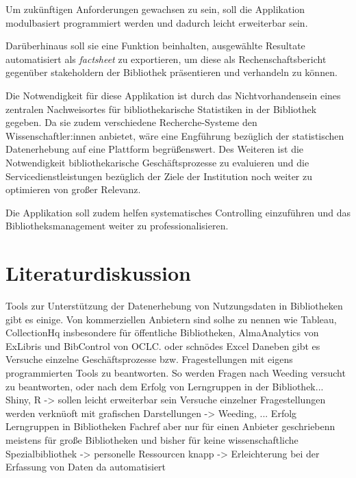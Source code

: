 \documentclass[10pt,a4paper,twocolumn,conference]{IEEEtran}
\begin{document}
Um zukünftigen Anforderungen gewachsen zu sein, soll die Applikation
modulbasiert programmiert werden und dadurch leicht erweiterbar sein.

Darüberhinaus soll sie eine Funktion beinhalten, ausgewählte
Resultate automatisiert als \textit{factsheet} zu exportieren, um diese 
als Rechenschaftsbericht gegenüber stakeholdern der Bibliothek präsentieren und
verhandeln zu können.

Die Notwendigkeit für diese Applikation ist durch das
Nichtvorhandensein eines zentralen Nachweisortes für bibliothekarische
Statistiken in der Bibliothek gegeben. Da sie zudem verschiedene Recherche-Systeme den
Wissenschaftler:innen anbietet, wäre eine Engführung bezüglich der statistischen
Datenerhebung auf eine Plattform begrüßenswert.
Des Weiteren ist die Notwendigkeit bibliothekarische Geschäftsprozesse zu evaluieren und die
Servicedienstleistungen bezüglich der Ziele der Institution noch weiter zu
optimieren von großer Relevanz.

Die Applikation soll zudem helfen systematisches Controlling einzuführen und das
Bibliotheksmanagement weiter zu professionalisieren.


\section{Literaturdiskussion}
Tools zur Unterstützung der Datenerhebung von Nutzungsdaten in Bibliotheken
gibt es einige. Von kommerziellen Anbietern sind solhe zu nennen wie Tableau,
CollectionHq insbesondere für öffentliche Bibliotheken, AlmaAnalytics von
ExLibris und BibControl von OCLC.
oder schnödes Excel
Daneben gibt es 
Versuche einzelne Geschäftsprozesse bzw. Fragestellungen mit eigens
programmierten Tools zu beantworten. So werden Fragen nach Weeding versucht zu
beantworten, oder nach dem Erfolg von Lerngruppen in der Bibliothek...
Shiny, R -> sollen leicht erweiterbar sein
Versuche einzelner Fragestellungen werden verknüoft mit grafischen
Darstellungen -> Weeding, ... Erfolg Lerngruppen in Bibliotheken
Fachref aber nur für einen Anbieter geschriebenn
meistens für große Bibliotheken und bisher für keine wissenschaftliche
Spezialbibliothek -> personelle Ressourcen knapp -> Erleichterung bei der
Erfassung von Daten da automatisiert
\end{document}
